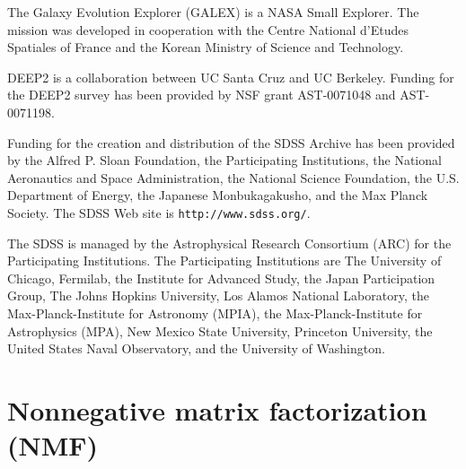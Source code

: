 \documentclass[10pt,preprint]{aastex}
\begin{document}
The Galaxy Evolution Explorer (GALEX) is a NASA Small Explorer. The
mission was developed in cooperation with the Centre National d'Etudes
Spatiales of France and the Korean Ministry of Science and Technology.

DEEP2 is a collaboration between UC Santa Cruz and UC Berkeley.
Funding for the DEEP2 survey has been provided by NSF grant
AST-0071048 and AST-0071198.

Funding for the creation and distribution of the SDSS Archive has been
provided by the Alfred P. Sloan Foundation, the Participating
Institutions, the National Aeronautics and Space Administration, the
National Science Foundation, the U.S. Department of Energy, the
Japanese Monbukagakusho, and the Max Planck Society. The SDSS Web site
is {\tt http://www.sdss.org/}.

The SDSS is managed by the Astrophysical Research Consortium (ARC) for
the Participating Institutions. The Participating Institutions are The
University of Chicago, Fermilab, the Institute for Advanced Study, the
Japan Participation Group, The Johns Hopkins University, Los Alamos
National Laboratory, the Max-Planck-Institute for Astronomy (MPIA),
the Max-Planck-Institute for Astrophysics (MPA), New Mexico State
University, Princeton University, the United States Naval Observatory,
and the University of Washington.
 

 

\appendix

\section{Nonnegative matrix factorization (NMF)}
\label{nmf}
\end{document}
